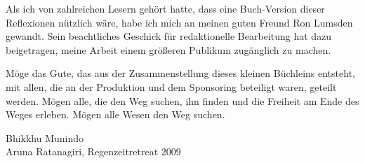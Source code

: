 Als ich von zahlreichen Lesern gehört hatte, dass eine Buch-Version
dieser Reflexionen nützlich wäre, habe ich mich an meinen guten Freund
Ron Lumsden gewandt. Sein beachtliches Geschick für redaktionelle
Bearbeitung hat dazu beigetragen, meine Arbeit einem größeren Publikum
zugänglich zu machen.

Möge das Gute, das aus der Zusammenstellung dieses kleinen Büchleins
entsteht, mit allen, die an der Produktion und dem Sponsoring beteiligt
waren, geteilt werden. Mögen alle, die den Weg suchen, ihn finden und
die Freiheit am Ende des Weges erleben. Mögen alle Wesen den Weg suchen.

\bigskip

{\par\raggedleft
Bhikkhu Munindo\\
Aruna Ratanagiri, Regenzeitretreat 2009
\par}

